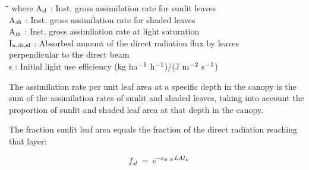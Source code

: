 \documentclass[11pt]{article}
\begin{document}
\nwln
\begin{tabbing}
\hspace{1.27cm}\=\hspace{1.27cm}\=\hspace{1.27cm}\=\hspace{1.27cm}\=%
\hspace{1.27cm}\=\hspace{1.27cm}\=\hspace{1.27cm}\=\hspace{1.27cm}\=%
\hspace{1.27cm}\=\hspace{1.27cm}\=\kill
where\> A$_{{\rm sl}}$\> : Inst. gross assimilation rate for sunlit leaves\> \> \> \> \> \> \> \> [kg ha$^{{\rm -1}}$ h$^{{\rm -1}}$]\\
\>A$_{{\rm sh}}$\> : Inst. gross assimilation rate for shaded leaves\> \> \> \> \> \> \> \> [kg ha$^{{\rm -1}}$ h$^{{\rm -1}}$]\\
\>A$_{{\rm m}}$\> : Inst. gross assimilation rate at light saturation\> \> \> \> \> \> \> \> [kg ha$^{{\rm -1}}$ h$^{{\rm -1}}$]\\
\>I$_{{\rm a,dr,sl}}$\> : Absorbed amount of the direct radiation flux by leaves\\
\>\>   perpendicular to the direct beam\> \> \> \> \> \> \> \> [J m$^{{\rm -2}}$ s$^{{\rm -1}}$]\\
\>$\epsilon$\> : Initial light use efficiency\> \> \> \> \> \>      (kg ha$^{{\rm -1}}$ h$^{{\rm -1}}$)/(J m$^{{\rm -2}}$ s$^{{\rm -1}}$)
\end{tabbing}

\bigskip
\bigskip
The assimilation rate per unit leaf area at a specific depth in the canopy is the sum of the
assimilation rates of sunlit and shaded leaves, taking into account the proportion of sunlit
and shaded leaf area at that depth in the canopy. 

\bigskip
\bigskip
\bigskip
The fraction sunlit leaf area equals the fraction of the direct radiation reaching that layer:

\begin{displaymath}
f _{sl} ~=~  e ^{-\kappa _{dr,bl} \, LAI _{L} }
\end{displaymath}
\end{document}
